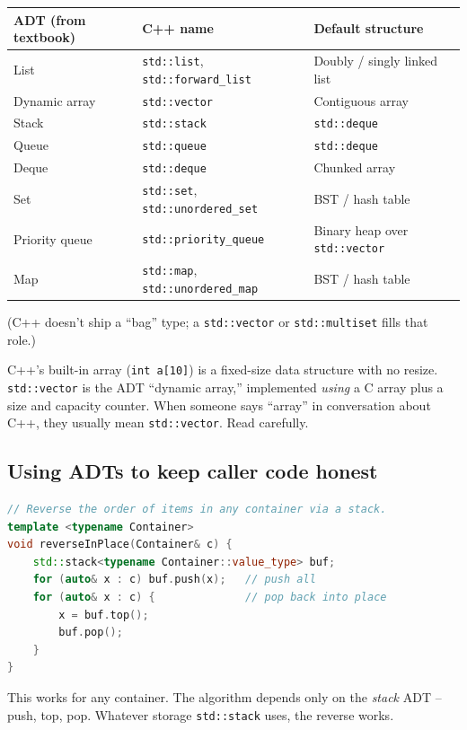 \documentclass[11pt]{article}
\begin{document}
\begin{center}
\footnotesize
\renewcommand{\arraystretch}{1.25}
\begin{tabular}{@{}llp{4.5cm}@{}}
\hline
\textbf{ADT (from textbook)} & \textbf{C++ name} & \textbf{Default structure} \\
\hline
List              & \texttt{std::list}, \texttt{std::forward\_list} & Doubly / singly linked list \\
Dynamic array     & \texttt{std::vector}           & Contiguous array \\
Stack             & \texttt{std::stack}            & \texttt{std::deque} \\
Queue             & \texttt{std::queue}            & \texttt{std::deque} \\
Deque             & \texttt{std::deque}            & Chunked array \\
Set               & \texttt{std::set}, \texttt{std::unordered\_set} & BST / hash table \\
Priority queue    & \texttt{std::priority\_queue}  & Binary heap over \texttt{std::vector} \\
Map               & \texttt{std::map}, \texttt{std::unordered\_map} & BST / hash table \\
\hline
\end{tabular}
\end{center}

(C++ doesn't ship a ``bag'' type; a \texttt{std::vector} or
\texttt{std::multiset} fills that role.)

\begin{warnbox}
C++'s built-in array (\texttt{int a[10]}) is a fixed-size data
structure with no resize. \texttt{std::vector} is the ADT ``dynamic
array,'' implemented \emph{using} a C array plus a size and capacity
counter. When someone says ``array'' in conversation about C++,
they usually mean \texttt{std::vector}. Read carefully.
\end{warnbox}

\subsection{Using ADTs to keep caller code honest}

\begin{examplebox}
\begin{lstlisting}[basicstyle=\ttfamily\small,frame=single,language=C++]
// Reverse the order of items in any container via a stack.
template <typename Container>
void reverseInPlace(Container& c) {
    std::stack<typename Container::value_type> buf;
    for (auto& x : c) buf.push(x);   // push all
    for (auto& x : c) {              // pop back into place
        x = buf.top();
        buf.pop();
    }
}
\end{lstlisting}
This works for any container. The algorithm depends only on the
\emph{stack} ADT -- push, top, pop. Whatever storage
\texttt{std::stack} uses, the reverse works.
\end{examplebox}
\end{document}
